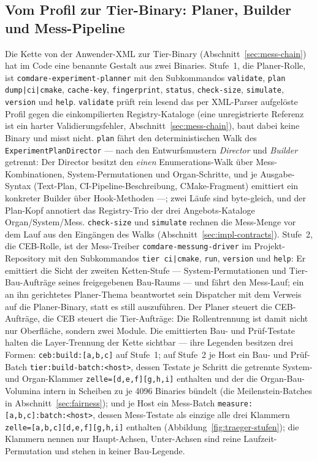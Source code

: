 \begin{nurlang}
\subsection{Vom Profil zur Tier-Binary: Planer, Builder und Mess-Pipeline}\label{sec:impl-pipeline}
Die Kette von der Anwender-XML zur Tier-Binary (Abschnitt~\ref{sec:mess-chain}) hat im Code eine
benannte Gestalt aus zwei Binaries. Stufe~1, die Planer-Rolle, ist \texttt{comdare-experiment-planner}
mit den Subkommandos \texttt{validate}, \texttt{plan dump|ci|cmake}, \texttt{cache-key},
\texttt{fingerprint}, \texttt{status}, \texttt{check-size}, \texttt{simulate}, \texttt{version} und
\texttt{help}. \texttt{validate} prüft rein lesend das per XML-Parser aufgelöste Profil gegen die
einkompilierten Registry-Kataloge (eine unregistrierte Referenz ist ein harter Validierungsfehler,
Abschnitt~\ref{sec:mess-chain}), baut dabei keine Binary und misst nicht. \texttt{plan} fährt den
deterministischen Walk des \texttt{ExperimentPlanDirector} --- nach den Entwurfsmustern \emph{Director}
und \emph{Builder}~\cite{gamma1994patterns} getrennt: Der Director besitzt den \emph{einen}
Enumerations-Walk über Mess-Kombinationen, System-Permutationen und Organ-Schritte, und je Ausgabe-Syntax
(Text-Plan, CI-Pipeline-Beschreibung, CMake-Fragment) emittiert ein konkreter Builder über Hook-Methoden
---; zwei Läufe sind byte-gleich, und der Plan-Kopf annotiert das Registry-Trio der drei Angebots-Kataloge
Organ/System/Mess. \texttt{check-size} und \texttt{simulate} rechnen die Mess-Menge vor dem Lauf aus den
Eingängen des Walks (Abschnitt~\ref{sec:impl-contracts}). Stufe~2, die CEB-Rolle, ist der Mess-Treiber
\texttt{comdare-messung-driver} im Projekt-Repository mit den Subkommandos \texttt{tier ci|cmake},
\texttt{run}, \texttt{version} und \texttt{help}: Er emittiert die Sicht der zweiten Ketten-Stufe ---
System-Permutationen und Tier-Bau-Aufträge seines freigegebenen Bau-Raums --- und fährt den Mess-Lauf;
ein an ihn gerichtetes Planer-Thema beantwortet sein Dispatcher mit dem Verweis auf die Planer-Binary,
statt es still auszuführen. Der Planer steuert die CEB-Aufträge, die CEB steuert die Tier-Aufträge: Die
Rollentrennung ist damit nicht nur Oberfläche, sondern zwei Module. Die emittierten Bau- und
Prüf-Testate halten die Layer-Trennung der Kette sichtbar --- ihre Legenden besitzen drei Formen:
\texttt{ceb:build:[a,b,c]} auf Stufe~1; auf Stufe~2 je Host ein Bau- und Prüf-Batch
\texttt{tier:build-batch:<host>}, dessen Testate je Schritt die getrennte System- und Organ-Klammer
\texttt{zelle=[d,e,f][g,h,i]} enthalten und der die Organ-Bau-Volumina intern in Scheiben zu je 4096 Binaries
bündelt (die Meilenstein-Batches in Abschnitt~\ref{sec:fairness}); und je Host ein Mess-Batch
\texttt{measure:[a,b,c]:batch:<host>}, dessen Mess-Testate als einzige alle drei Klammern
\texttt{zelle=[a,b,c][d,e,f][g,h,i]} enthalten (Abbildung~\ref{fig:traeger-stufen}); die Klammern nennen nur
Haupt-Achsen, Unter-Achsen sind reine Laufzeit-Permutation und stehen in keiner Bau-Legende.


\end{nurlang}

